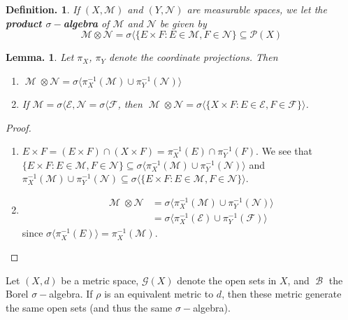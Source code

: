 \documentclass[11pt, a4paper]{memoir}
\theoremstyle{change}
\newtheorem{lemma}[theorem]{Lemma.}
\theoremstyle{plain}
\theoremstyle{nonumberplain}
\newtheorem{definition}{Definition.}
\newtheorem{proof}{Proof}
\DeclareMathOperator{\M}{{\mathcal{M}}}
\DeclareMathOperator{\B}{{\mathcal{B}}}
\begin{document}
\begin{definition}
    If $(X,\mathcal{M})$ and $(Y,\mathcal{N})$ are measurable spaces, we let the \textbf{product $\sigma-$algebra} of $\mathcal{M}$ and $\mathcal{N}$ be given by
    \begin{equation*}
        \mathcal{M}\otimes\mathcal{N}=\sigma\langle\{E\times F:E\in\mathcal{M},F\in\mathcal{N}\}\subseteq\mathcal{P}(X)
    \end{equation*}
\end{definition}
\begin{lemma}
    Let $\pi_X$, $\pi_Y$ denote the coordinate projections.
    Then
    \begin{enumerate}
        \item $\M\otimes\mathcal{N}=\sigma\langle\pi_X^{-1}(\mathcal{M})\cup\pi_Y^{-1}(\mathcal{N})\rangle$
        \item If $\mathcal{M}=\sigma\langle\mathcal{E},\mathcal{N}=\sigma\langle\mathcal{F}$, then $\M\otimes\mathcal{N}=\sigma\langle\{X\times F:E\in\mathcal{E},F\in\mathcal{F}\}\rangle$.
    \end{enumerate}
\end{lemma}
\begin{proof}
    \begin{enumerate}
        \item $E\times F=(E\times F)\cap(X\times F)=\pi^{-1}_X(E)\cap\pi^{-1}_Y(F)$.
            We see that $\{E\times F:E\in\mathcal{M},F\in\mathcal{N}\}\subseteq\sigma\langle\pi_X^{-1}(\mathcal{M})\cup\pi_Y^{-1}(\mathcal{N})\rangle$
            and $\pi_X^{-1}(\mathcal{M})\cup\pi_Y^{-1}(\mathcal{N})\subseteq\sigma\langle\{E\times F:E\in\mathcal{M},F\in\mathcal{N}\}\rangle$.
        \item
            \begin{align*}
                \M\otimes\mathcal{N} &= \sigma\langle\pi_X^{-1}(\mathcal{M})\cup\pi_Y^{-1}(\mathcal{N})\rangle\\
                                     &= \sigma\langle\pi_X^{-1}(\mathcal{E})\cup\pi_Y^{-1}(\mathcal{F})\rangle
            \end{align*}
            since $\sigma\langle\pi_X^{-1}(E)\rangle=\pi_X^{-1}(\mathcal{M})$.
    \end{enumerate}
\end{proof}
Let $(X,d)$ be a metric space, $\mathcal{G}(X)$ denote the open sets in $X$, and $\B$ the Borel $\sigma-$algebra.
If $\rho$ is an equivalent metric to $d$, then these metric generate the same open sets (and thus the same $\sigma-$algebra).
\end{document}
